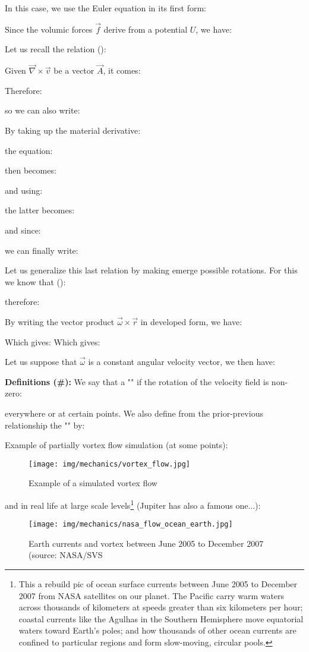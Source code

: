 	In this case, we use the Euler equation in its first form:
	
	Since the volumic forces $\vec{f}$ derive from a potential $U$, we have:
	
	Let us recall the relation ():
	
	Given $\vec{\nabla}\times\vec{v}$ be a vector $\vec{A}$, it comes:
	
	Therefore:
	
	so we can also write:
	
	By taking up the material derivative:
	
	the equation:
	
	then becomes:
	
	and using:
	
	the latter becomes:
	
	and since:
	
	we can finally write:
	
	Let us generalize this last relation by making emerge possible rotations. For this we know that ():
	
	therefore:
	
	By writing the vector product $\vec{\omega}\times\vec{r}$ in developed form, we have:
	
	Which gives:
	Which gives:
	
	Let us suppose that $\vec{\omega}$ is a constant angular velocity vector, we then have:
	
	\textbf{Definitions (\#\mydef):} We say that a "" if the rotation of the velocity field is non-zero:
	
	everywhere or at certain points. We also define from the prior-previous relationship the "" by:
	
	Example of partially vortex flow simulation (at some points):
	\begin{figure}[H]
		\centering
		\texttt{[image: img/mechanics/vortex\_flow.jpg]}
		\caption{Example of a simulated vortex flow}
	\end{figure}
	and in real life at large scale levels\footnote{This a rebuild pic of ocean surface currents between June 2005 to December 2007 from NASA satellites on our planet. The Pacific carry warm waters across thousands of kilometers at speeds greater than six kilometers per hour; coastal currents like the Agulhas in the Southern Hemisphere move equatorial waters toward Earth's poles; and how thousands of other ocean currents are confined to particular regions and form slow-moving, circular pools.} (Jupiter has also a famous one...):
	\begin{figure}[H]
		\centering
		\texttt{[image: img/mechanics/nasa\_flow\_ocean\_earth.jpg]}
		\caption{Earth currents and vortex between June 2005 to December 2007 (source: NASA/SVS}
	\end{figure}
	
